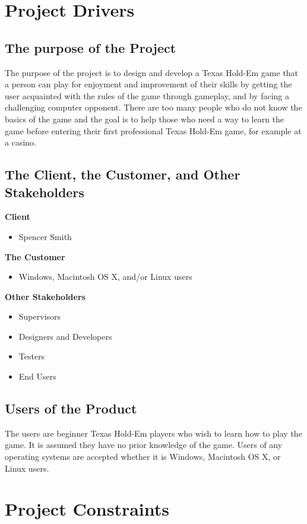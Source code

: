 \documentclass[12pt]{article}
\begin{document}
	\newpage
	\tableofcontents
	\listoffigures
	\listoftables

	\newpage
	\section{Project Drivers}
	\subsection{The purpose of the Project}
	The purpose of the project is to design and develop a Texas Hold-Em game that a person 		can play for enjoyment and improvement of their skills by getting the user acquainted 		with the rules of the game through gameplay, and by facing a challenging computer 			opponent. There are too many people who do not know the basics of the game and the goal 	is to help those who need a way to learn the game before entering their first 				professional Texas Hold-Em game, for example at a casino.
	\subsection{The Client, the Customer, and Other Stakeholders}
	\textbf{Client}
	\begin{itemize}
	\item Spencer Smith
	\end{itemize}
	\textbf{The Customer}
	\begin{itemize}
	\item Windows, Macintosh OS X, and/or Linux users
	\end{itemize}
	
	\textbf{Other Stakeholders}
	\begin{itemize}
	\item Supervisors
	\item Designers and Developers
	\item Testers
	\item End Users
	\end{itemize}

	\subsection{Users of the Product}
	The users are beginner Texas Hold-Em players who wish to learn how to play the game. It 	is assumed they have no prior knowledge of the game.  Users of any operating systems 		are accepted whether it is Windows, Macintosh OS X, or Linux users. 
	
	\section{Project Constraints}
\end{document}
